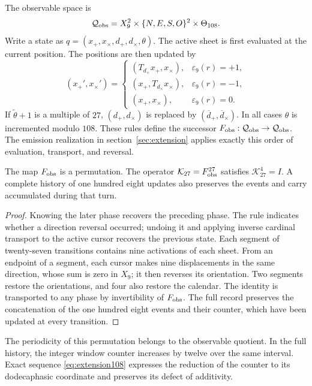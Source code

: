 The observable space is
\[
 \mathcal Q_{\rm obs}
 =X_9^2\times\{N,E,S,O\}^2\times\Theta_{108}.
\]
Write a state as
\(q=(x_+,x_\times,d_+,d_\times,\theta)\). The active sheet is first evaluated
at the current position. The positions are then updated by
\begin{equation}
 (x_+',x_\times')=
 \begin{cases}
 (T_{d_+}x_+,x_\times),&\varepsilon_9(r)=+1,\\
 (x_+,T_{d_\times}x_\times),&\varepsilon_9(r)=-1,\\
 (x_+,x_\times),&\varepsilon_9(r)=0.
 \end{cases}
 \label{ii:tpk-fobs-posiciones}
\end{equation}
If \(\widetilde\theta+1\) is a multiple of \(27\),
\((d_+,d_\times)\) is replaced by \((\overline d_+,\overline d_\times)\).
In all cases \(\theta\) is incremented modulo \(108\). These rules
define the successor
\(F_{\rm obs}:\mathcal Q_{\rm obs}\to\mathcal Q_{\rm obs}\).
The emission realization in section~\ref{sec:extension} applies
exactly this order of evaluation, transport, and reversal.

\begin{proposition}
\label{ii:tpk-retorno-observable}
The map \(F_{\rm obs}\) is a permutation. The operator
\(\mathcal K_{27}=F_{\rm obs}^{27}\) satisfies
\(\mathcal K_{27}^{4}=I\). A complete history of one hundred eight
updates also preserves the events and carry accumulated
during that turn.
\end{proposition}
\begin{proof}
Knowing the later phase recovers the preceding phase. The rule indicates
whether a direction reversal occurred; undoing it and applying
inverse cardinal transport to the active cursor recovers the previous state.
Each segment of twenty-seven transitions contains nine activations of each
sheet. From an endpoint of a segment, each cursor makes nine displacements
in the same direction, whose sum is zero in \(X_9\); it then reverses
its orientation. Two segments restore the orientations, and four also restore
the calendar. The identity is transported to any phase by
invertibility of \(F_{\rm obs}\). The full record preserves the
concatenation of the one hundred eight events and their counter, which have been
updated at every transition.
\end{proof}

The periodicity of this permutation belongs to the observable quotient. In
the full history, the integer window counter increases by twelve
over the same interval. Exact sequence
\eqref{eq:extension108} expresses the reduction of the counter to its
dodecaphasic coordinate and preserves its defect of additivity.

